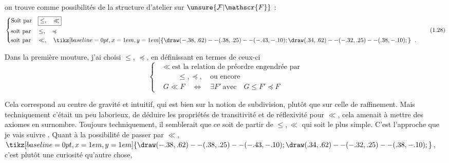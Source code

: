 on trouve comme possibilités  de  la structure d'atelier sur $\unsure{\mathcal{F}|\mathscr{F}}$ :
\[
\left\{\begin{aligned}
 &\text{Soit par}\quad\boxed{\leq,\quad\ll}\\
 &\text{soit par}\quad\leq,\quad\preccurlyeq\\
 &\text{soit par}\quad\ll,\quad\mathrel{\tikz[baseline=0pt,x=1em,y=1em]{\draw (-.38,.62)--(.38,.25)--(-.43,-.10); \draw (.34,.62)--(-.32,.25)--(.38,-.10);}}\ .
\end{aligned}\right.
\tag*{(1.28)}
\]

Dans la première mouture, j'ai choisi $\leq$, $\preccurlyeq$, en définissant en termes de ceux-ci
\[
\left\{\begin{aligned}
 &\ll\ \text{est la relation de préordre engendrée par}\\
 &\qquad\leq,\preccurlyeq,\quad \text{ou encore}\\
 &G\ll F\quad\Longleftrightarrow\quad\exists F'\ \text{avec}\quad G\leq F'\preccurlyeq F
\end{aligned}\right.
\tag*{(1.29)}
\]

Cela correspond au centre de gravité   et intuitif, qui est bien sur la notion de subdivision, plutôt que sur celle de raffinement. Mais techniquement c'était un peu laborieux, de déduire les propriétés de transitivité et  de réflexivité pour $\ll$, cela amenait à mettre des axiomes en surnombre. Toujours techniquement, il semblerait que ce soit de partir de $\leq,\ll$ qui soit le plus simple. C'est l'approche que je vais suivre . Quant à la possibilité de passer par $\ll$, $\mathrel{\tikz[baseline=0pt,x=1em,y=1em]{\draw (-.38,.62)--(.38,.25)--(-.43,-.10); \draw (.34,.62)--(-.32,.25)--(.38,-.10);}}$, c'est plutôt une curiosité qu'autre chose,
